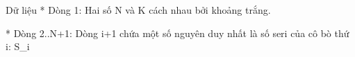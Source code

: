 Dữ liệu
* Dòng 1: Hai số N và K cách nhau bởi khoảng trắng.  

   * Dòng 2..N+1: Dòng i+1 chứa một số nguyên duy nhất là số seri của cô bò thứ i: S\_i